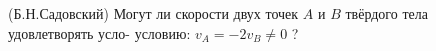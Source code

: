 (Б.Н.Садовский)
Могут ли скорости двух точек $A$ и $B$ твёрдого тела удовлетворять усло-
условию: $v_ A= -2v_B\neq0$ ?
